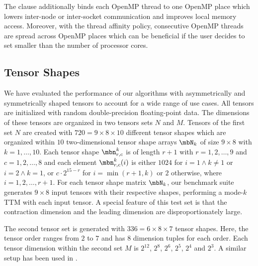 The  clause additionally binds each OpenMP thread to one OpenMP place which lowers inter-node or inter-socket communication and improves local memory access.
Moreover, with the  thread affinity policy, consecutive OpenMP threads are spread across OpenMP places which can be beneficial if the user decides to set  smaller than the number of processor cores.

 

\subsection{Tensor Shapes} 
We have evaluated the performance of our algorithms with asymmetrically and symmetrically shaped tensors to account for a wide range of use cases.
All tensors are initialized with random double-precision floating-point data.
The dimensions of these tensors are organized in two tensors sets $N$ and $M$. 
Tensors of the first set $N$ are created with $720 = 9\times 8 \times 10$ different tensor shapes which are organized within $10$ two-dimensional tensor shape arrays $\mbN_k$ of size $9 \times 8$ with $k=1,\dots,10$.
Each tensor shape $\mbn_{r,c}^k$ is of length $r+1$ with $r = 1,2,\dots,9$ and $c = 1,2,\dots,8$ and each element $\mbn_{r,c}^k(i)$ is either $1024$ for $i = 1 \wedge k \neq 1$ or $i = 2 \wedge k = 1$, or $c \cdot 2^{15-r}$ for $i = \min(r+1,k)$ or $2$ otherwise, where $i = 1,2,\dots,r+1$.
For each tensor shape matrix $\mbN_k$, our benchmark suite generates $9\times 8$ input tensors with their respective shapes, performing a mode-$k$ TTM with each input tensor.
A special feature of this test set is that the contraction dimension and the leading dimension are disproportionately large.

The second tensor set is generated with $336 = 6\times8\times 7$ tensor shapes.
Here, the tensor order ranges from $2$ to $7$ and has $8$ dimension tuples for each order.
Each tensor dimension within the second set $M$ is $2^{12}$, $2^{8}$, $2^{6}$, $2^5$, $2^4$ and $2^3$.
A similar setup has been used in \cite{bassoy:2019:ttv, bassoy:2018:fast}.

